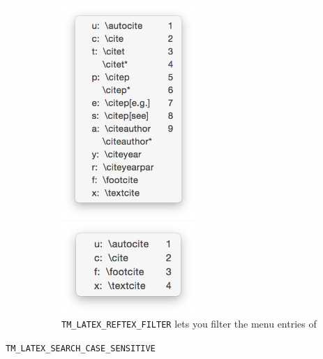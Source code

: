 \documentclass[11pt, x11names]{article}
\begin{document}
\begin{description}
  \begin{figure}[htbp]
    \begin{minipage}[t]{0.5\textwidth}
      \vspace{0cm}
      \centering
        \includegraphics[width=0.5\textwidth]{Figures/Citation Completion - Without Ref-TeX Filter}
    \end{minipage}
    \begin{minipage}[t]{0.5\textwidth}
      \vspace{0cm}
      \centering
        \includegraphics[width=0.5\textwidth]{Figures/Citation Completion - With Ref-TeX Filter}
    \end{minipage}

    \caption{\texttt{\texttt{TM\_LATEX\_REFTEX\_FILTER}} lets you filter the menu entries of }
    \label{fig:TM_LATEX_REFTEX_FILTER}
  \end{figure}

  \item[\texttt{TM\_LATEX\_SEARCH\_CASE\_SENSITIVE}]~\\


\end{description}
\end{document}
